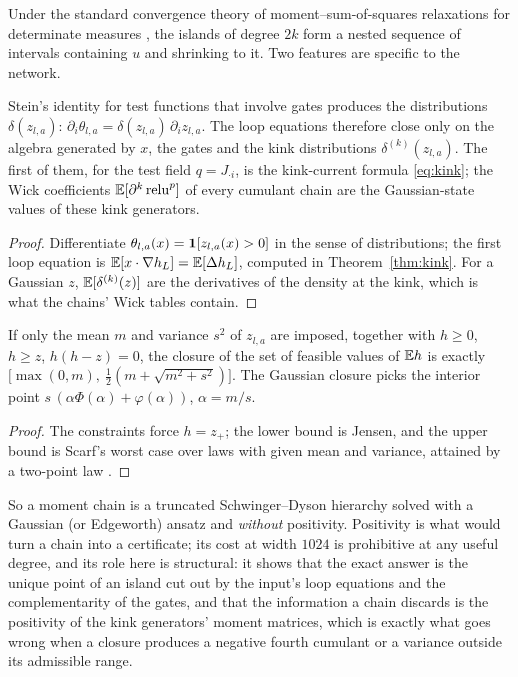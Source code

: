 Under the standard convergence theory of moment--sum-of-squares relaxations for determinate measures
\cite{Las}, the islands of degree $2k$ form a nested sequence of intervals containing $u$ and shrinking to it. Two
features are specific to the network.

\begin{proposition}\label{prop:loops}
Stein's identity for test functions that involve gates produces the distributions $\delta(z_{l,a})$:
$\partial_i\theta_{l,a}=\delta(z_{l,a})\,\partial_iz_{l,a}$. The loop equations therefore close only on the algebra generated by
$x$, the gates and the kink distributions $\delta^{(k)}(z_{l,a})$. The first of them, for the test field $q=J_{\cdot i}$, is
the kink-current formula \eqref{eq:kink}; the Wick coefficients $\mathbb E[\partial^k\operatorname{relu}^p]$ of every cumulant chain are the
Gaussian-state values of these kink generators.
\end{proposition}
\begin{proof}
Differentiate $\theta_{l,a}(x)=\mathbf 1[z_{l,a}(x)>0]$ in the sense of distributions; the first loop equation is
$\mathbb E[x\cdot\nabla h_L]=\mathbb E[\Delta h_L]$, computed in Theorem~\ref{thm:kink}. For a Gaussian $z$, $\mathbb E[\delta^{(k)}(z)]$ are the
derivatives of the density at the kink, which is what the chains' Wick tables contain.
\end{proof}

\begin{proposition}\label{prop:scarf}
If only the mean $m$ and variance $s^2$ of $z_{l,a}$ are imposed, together with $h\ge0$, $h\ge z$, $h(h-z)=0$, the closure of the set of feasible
values of $\mathbb E h$ is exactly $\big[\max(0,m),\ \tfrac12(m+\sqrt{m^2+s^2})\big]$. The Gaussian closure picks the interior
point $s\,(\alpha\Phi(\alpha)+\varphi(\alpha))$, $\alpha=m/s$.
\end{proposition}
\begin{proof}
The constraints force $h=z_+$; the lower bound is Jensen, and the upper bound is Scarf's worst case over laws with
given mean and variance, attained by a two-point law \cite{Scarf}.
\end{proof}

So a moment chain is a truncated Schwinger--Dyson hierarchy solved with a Gaussian (or Edgeworth) ansatz and
\emph{without} positivity. Positivity is what would turn a chain into a certificate; its cost at width $1024$ is
prohibitive at any useful degree, and its role here is structural: it shows that the exact answer is the unique point
of an island cut out by the input's loop equations and the complementarity of the gates, and that the information a
chain discards is the positivity of the kink generators' moment matrices, which is exactly what goes wrong when a
closure produces a negative fourth cumulant or a variance outside its admissible range.
